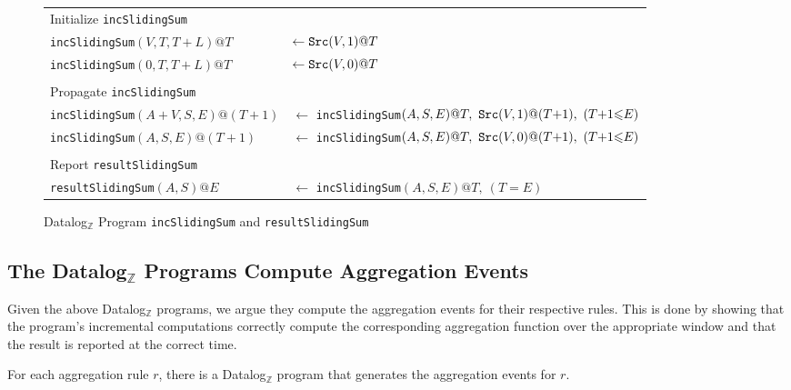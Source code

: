 \begin{figure}[h!]
\begin{mdframed}[leftmargin=0pt,rightmargin=0mm]
\begin{small}
\begin{tabular}{ll}
\multicolumn{2}{l}{Initialize \texttt{incSlidingSum}}\\
\texttt{incSlidingSum}$(V, T, T{+}L)@T$ & $\leftarrow \mbox{\tt Src}(V,1)@T$\\
\texttt{incSlidingSum}$(0, T, T{+}L)@T$ & $\leftarrow \mbox{\tt Src}(V,0)@T$\\
& \\
\multicolumn{2}{l}{Propagate \texttt{incSlidingSum}}\\
\texttt{incSlidingSum}$(A{+}V, S, E)@(T{+}1)$ & $\leftarrow$ \texttt{incSlidingSum}$(A, S, E)@T ,\  \mbox{\tt Src}(V,1)@(T{+}1),\ (T{+}1{\leq}E)$\\
\texttt{incSlidingSum}$(A, S, E)@(T{+}1)$ & $\leftarrow$ \texttt{incSlidingSum}$(A, S, E)@T ,\  \mbox{\tt Src}(V,0)@(T{+}1),\ (T{+}1{\leq}E)$\\
& \\
\multicolumn{2}{l}{Report \texttt{resultSlidingSum}}\\
\texttt{resultSlidingSum}$(A, S)@E$ & $\leftarrow$ \texttt{incSlidingSum}$(A, S, E)@T ,\  (T=E)$\\
\end{tabular}
\end{small}
\end{mdframed}
\caption{Datalog$_{\mathbb{Z}}$ Program \texttt{incSlidingSum} and \texttt{resultSlidingSum}}
    \label{fig:sliding-sum-program}
\end{figure}

\subsection{The Datalog$_{\mathbb{Z}}$ Programs Compute Aggregation Events}

Given the above Datalog$_{\mathbb{Z}}$ programs,
we argue they compute the aggregation events for their respective rules.
This is done by showing that the program's incremental
computations correctly compute the corresponding aggregation function over the appropriate window and
that the result is reported at the correct time.

\begin{thm}\label{thm:aggregation-Datalog-program}
For each aggregation rule $r$,
there is a Datalog$_{\mathbb{Z}}$ program that generates
the aggregation events for $r$.
\end{thm}

